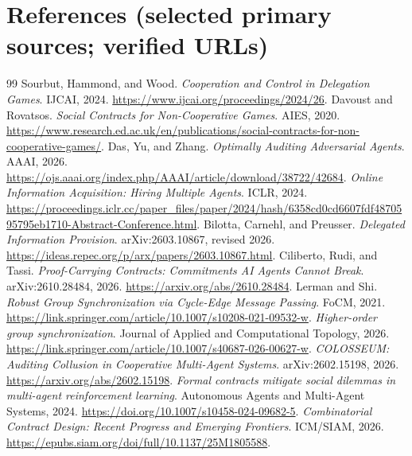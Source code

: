 \documentclass[10pt,a4paper]{article}
\begin{document}
\section*{References (selected primary sources; verified URLs)}
\begin{thebibliography}{99}\setlength{\itemsep}{2pt}
 Sourbut, Hammond, and Wood. \emph{Cooperation and Control in Delegation Games}. IJCAI, 2024. \url{https://www.ijcai.org/proceedings/2024/26}.
 Davoust and Rovatsos. \emph{Social Contracts for Non-Cooperative Games}. AIES, 2020. \url{https://www.research.ed.ac.uk/en/publications/social-contracts-for-non-cooperative-games/}.
 Das, Yu, and Zhang. \emph{Optimally Auditing Adversarial Agents}. AAAI, 2026. \url{https://ojs.aaai.org/index.php/AAAI/article/download/38722/42684}.
 \emph{Online Information Acquisition: Hiring Multiple Agents}. ICLR, 2024. \url{https://proceedings.iclr.cc/paper_files/paper/2024/hash/6358cd0cd6607fdf4870595795eb1710-Abstract-Conference.html}.
 Bilotta, Carnehl, and Preusser. \emph{Delegated Information Provision}. arXiv:2603.10867, revised 2026. \url{https://ideas.repec.org/p/arx/papers/2603.10867.html}.
 Ciliberto, Rudi, and Tassi. \emph{Proof-Carrying Contracts: Commitments AI Agents Cannot Break}. arXiv:2610.28484, 2026. \url{https://arxiv.org/abs/2610.28484}.
 Lerman and Shi. \emph{Robust Group Synchronization via Cycle-Edge Message Passing}. FoCM, 2021. \url{https://link.springer.com/article/10.1007/s10208-021-09532-w}.
 \emph{Higher-order group synchronization}. Journal of Applied and Computational Topology, 2026. \url{https://link.springer.com/article/10.1007/s40687-026-00627-w}.
 \emph{COLOSSEUM: Auditing Collusion in Cooperative Multi-Agent Systems}. arXiv:2602.15198, 2026. \url{https://arxiv.org/abs/2602.15198}.
 \emph{Formal contracts mitigate social dilemmas in multi-agent reinforcement learning}. Autonomous Agents and Multi-Agent Systems, 2024. \url{https://doi.org/10.1007/s10458-024-09682-5}.
 \emph{Combinatorial Contract Design: Recent Progress and Emerging Frontiers}. ICM/SIAM, 2026. \url{https://epubs.siam.org/doi/full/10.1137/25M1805588}.
\end{thebibliography}
\end{document}
